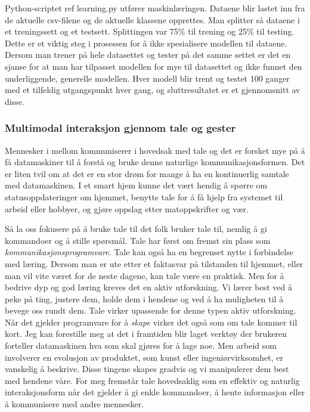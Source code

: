 Python-scriptet {\color{red} ref learning.py} utfører maskinlæringen. Dataene blir lastet inn fra de aktuelle csv-filene og de aktuelle klassene opprettes. Man splitter så dataene i et treningssett og et testsett. Splittingen var 75\% til trening og 25\% til testing. Dette er et viktig steg i prosessen for å ikke spesialisere modellen til dataene. Dersom man trener på hele datasettet og tester på det samme settet er det en sjanse for at man har tilpasset modellen for mye til datasettet og ikke funnet den underliggende, generelle modellen. Hver modell blir trent og testet 100 ganger med et tilfeldig utgangspunkt hver gang, og sluttresultatet er et gjennomsnitt av disse.

\subsubsection*{Multimodal interaksjon gjennom tale og gester}
Mennesker i mellom kommuniserer i hovedsak med tale og det er forsket mye på å få datamaskiner til å forstå og bruke denne naturlige kommunikasjonsformen. Det er liten tvil om at det er en stor drøm for mange å ha en kontinuerlig samtale med datamaskinen. I et smart hjem kunne det vært hendig å spørre om statusoppdateringer om hjemmet, benytte tale for å få hjelp fra systemet til arbeid eller hobbyer, og gjøre oppslag etter matoppskrifter og vær.

Så la oss fokusere på å bruke tale til det folk bruker tale til, nemlig å gi kommandoer og å stille spørsmål. Tale har først om fremst sin plass som \emph{kommunikasjonsprogramvare}. Tale kan også ha en begrenset nytte i forbindelse med læring. Dersom man er ute etter et faktasvar på tilstanden til hjemmet, eller man vil vite været for de neste dagene, kan tale være en praktisk. Men for å bedrive dyp og god læring kreves det en aktiv utforskning. Vi lærer best ved å peke på ting, justere dem, holde dem i hendene og ved å ha muligheten til å bevege oss rundt dem. Tale virker upassende for denne typen aktiv utforskning. Når det gjelder programvare for å \emph{skape} virker det også som om tale kommer til kort. Jeg kan forestille meg at det i framtiden blir laget verktøy der brukeren forteller datamaskinen hva som skal gjøres for å lage noe. Men arbeid som involverer en evolusjon av produktet, som kunst eller ingeniørvirksomhet, er vanskelig å beskrive. Disse tingene skapes gradvis og vi manipulerer dem best med hendene våre. For meg fremstår tale hovedsaklig som en effektiv og naturlig interaksjonsform når det gjelder å gi enkle kommandoer, å hente informasjon eller å kommunisere med andre mennesker.

